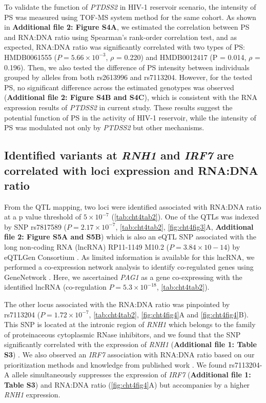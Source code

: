 \documentclass{book}
\begin{document}
\begin{refsection}
To validate the function of \textit{PTDSS2} in HIV-1 reservoir scenario, the intensity of PS was measured using TOF-MS system method for the same cohort.
As shown in \textbf{Additional file 2: Figure S4A}, we estimated the correlation between PS and RNA:DNA ratio using Spearman's rank-order correlation test, and as expected, RNA:DNA ratio was significantly correlated with two types of PS: HMDB0061555 ($P = 5.66 \times 10^{-3}$, $\rho$ = 0.220) and HMDB0012417 (P = 0.014, $\rho$ = 0.196).
Then, we also tested the difference of PS intensity between individuals grouped by alleles from both rs2613996 and rs7113204.
However, for the tested PS, no significant difference across the estimated genotypes was observed (\textbf{Additional file 2: Figure S4B and S4C}), which is consistent with the RNA expression results of \textit{PTDSS2} in current study.
These results suggest the potential function of PS in the activity of HIV-1 reservoir, while the intensity of PS was modulated not only by \textit{PTDSS2} but other mechanisms.

\subsection*{Identified variants at \textit{RNH1} and \textit{IRF7} are correlated with loci expression and RNA:DNA ratio}
From the QTL mapping, two loci were identified associated with RNA:DNA ratio at a p value threshold of $5 \times 10^{-7}$ (\ref{tab:cht4tab2}).
One of the QTLs was indexed by SNP rs7817589 ($P = 2.17 \times 10^{-7}$, \ref{tab:cht4tab2}, \ref{fig:cht4fig3}A, \textbf{Additional file 2: Figure S5A and S5B}) which is also an eQTL SNP associated with the long non-coding RNA (lncRNA) RP11-1149 M10.2 ($P = 3.84 \times 10-14$) by eQTLGen Consortium \cite{Võsa2018Unraveling}.
As limited information is available for this lncRNA, we performed a co-expression network analysis to identify co-regulated genes using GeneNetwork \cite{Deelen2019Improving}.
Here, we ascertained \textit{PAG1} as a gene co-expressing with the identified lncRNA (co-regulation $P = 5.3 \times 10^{-18}$, \ref{tab:cht4tab2}).

The other locus associated with the RNA:DNA ratio was pinpointed by rs7113204 ($P = 1.72 \times 10^{-7}$, \ref{tab:cht4tab2}, \ref{fig:cht4fig4}A and \ref{fig:cht4fig4}B).
This SNP is located at the intronic region of \textit{RNH1} which belongs to the family of proteinaceous cytoplasmic RNase inhibitors, and we found that the SNP significantly correlated with the expression of \textit{RNH1} (\textbf{Additional file 1: Table S3}) \cite{Võsa2018Unraveling}.
We also observed an \textit{IRF7} association with RNA:DNA ratio based on our prioritization methods and knowledge from published work \cite{Sirois2011TRAF6}.
We found rs7113204-A allele simultaneously suppresses the expression of \textit{IRF7} (\textbf{Additional file 1: Table S3}) and RNA:DNA ratio (\ref{fig:cht4fig4}A) but accompanies by a higher \textit{RNH1} expression.


\end{refsection}
\end{document}
